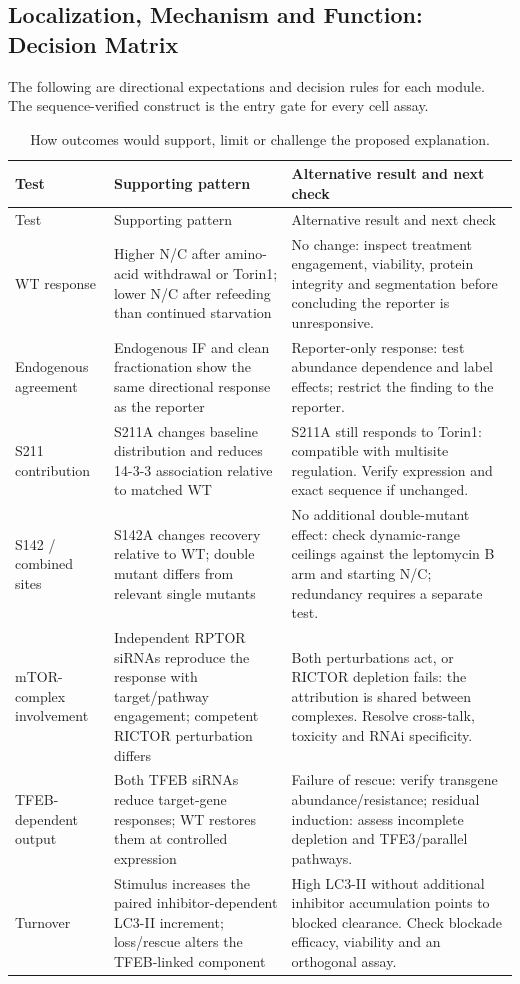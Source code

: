 \subsection{Localization, Mechanism and Function: Decision Matrix}
The following are directional expectations and decision rules for each module. The sequence-verified construct is the entry gate for every cell assay.

\small
\begin{longtable}{L{0.20\textwidth}L{0.34\textwidth}L{0.38\textwidth}}
\caption{How outcomes would support, limit or challenge the proposed explanation.}\\
\toprule Test & Supporting pattern & Alternative result and next check \\
\midrule\endfirsthead
\toprule Test & Supporting pattern & Alternative result and next check \\
\midrule\endhead
\bottomrule\endfoot
WT response & Higher N/C after amino-acid withdrawal or Torin1; lower N/C after refeeding than continued starvation & No change: inspect treatment engagement, viability, protein integrity and segmentation before concluding the reporter is unresponsive. \\
Endogenous agreement & Endogenous IF and clean fractionation show the same directional response as the reporter & Reporter-only response: test abundance dependence and label effects; restrict the finding to the reporter. \\
S211 contribution & S211A changes baseline distribution and reduces 14-3-3 association relative to matched WT & S211A still responds to Torin1: compatible with multisite regulation. Verify expression and exact sequence if unchanged. \\
S142 / combined sites & S142A changes recovery relative to WT; double mutant differs from relevant single mutants & No additional double-mutant effect: check dynamic-range ceilings against the leptomycin B arm and starting N/C; redundancy requires a separate test. \\
mTOR-complex involvement & Independent RPTOR siRNAs reproduce the response with target/pathway engagement; competent RICTOR perturbation differs & Both perturbations act, or RICTOR depletion fails: the attribution is shared between complexes. Resolve cross-talk, toxicity and RNAi specificity. \\
TFEB-dependent output & Both TFEB siRNAs reduce target-gene responses; WT restores them at controlled expression & Failure of rescue: verify transgene abundance/resistance; residual induction: assess incomplete depletion and TFE3/parallel pathways. \\
Turnover & Stimulus increases the paired inhibitor-dependent LC3-II increment; loss/rescue alters the TFEB-linked component & High LC3-II without additional inhibitor accumulation points to blocked clearance. Check blockade efficacy, viability and an orthogonal assay. \\
\end{longtable}
\normalsize

